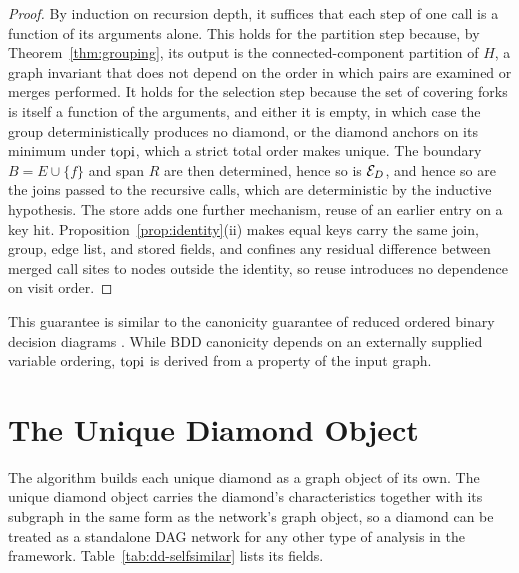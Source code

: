 \documentclass[12pt]{report}
\begin{document}
\begin{proof}
By induction on recursion depth, it suffices that each step of one call is a function of its arguments alone. This holds for the partition step because, by Theorem~\ref{thm:grouping}, its output is the connected-component partition of $H$, a graph invariant that does not depend on the order in which pairs are examined or merges performed. It holds for the selection step because the set of covering forks is itself a function of the arguments, and either it is empty, in which case the group deterministically produces no diamond, or the diamond anchors on its minimum under $\mathrm{topi}$, which a strict total order makes unique. The boundary $B = E \cup \{f\}$ and span $R$ are then determined, hence so is $\mathcal{E}_D$, and hence so are the joins passed to the recursive calls, which are deterministic by the inductive hypothesis. The store adds one further mechanism, reuse of an earlier entry on a key hit. Proposition~\ref{prop:identity}(ii) makes equal keys carry the same join, group, edge list, and stored fields, and confines any residual difference between merged call sites to nodes outside the identity, so reuse introduces no dependence on visit order.
\end{proof}

This guarantee is similar to the canonicity guarantee of reduced ordered binary decision diagrams \cite{bryant1986graph}. While BDD canonicity depends on an externally supplied variable ordering, $\mathrm{topi}$ is derived from a property of the input graph.

\section{The Unique Diamond Object}
\label{sec:dd-representation}
\label{sec:dd-selfsimilar}

The algorithm builds each unique diamond as a graph object of its own. The unique diamond object carries the diamond's characteristics together with its subgraph in the same form as the network's graph object, so a diamond can be treated as a standalone DAG network for any other type of analysis in the framework. Table~\ref{tab:dd-selfsimilar} lists its fields.
\end{document}
